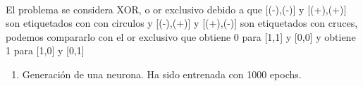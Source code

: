 \documentclass[10pt]{article}
\begin{document}
    \begin{center}
    \end{center}
    { \hspace*{\fill} \\}
    
    El problema se considera XOR, o or exclusivo debido a que {[}(-),(-){]}
y {[}(+),(+){]} son etiquetados con con circulos y {[}(-),(+){]} y
{[}(+),(-){]} son etiquetados con cruces, podemos compararlo con el or
exclusivo que obtiene 0 para {[}1,1{]} y {[}0,0{]} y obtiene 1 para
{[}1,0{]} y {[}0,1{]}

    \begin{enumerate}
\def\labelenumi{(\alph{enumi})}
\setcounter{enumi}{1}
\itemsep1pt\parskip0pt
\item
  Generación de una neurona. Ha sido entrenada con 1000 epochs.
\end{enumerate}
\end{document}
